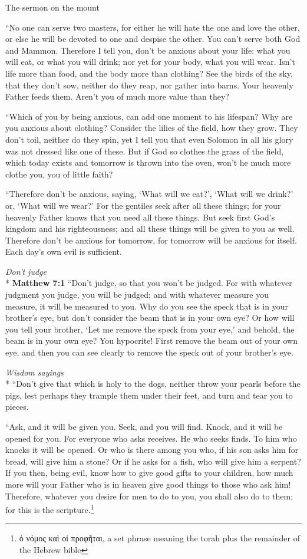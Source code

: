 \documentclass[10pt,twoside]{article} %
\newcommand{\quotesize}{\normalsize{}}
\newenvironment{quotetext}{\begingroup\quotesize}{\endgroup}
\newcommand{\intex}[1]{\index[texts]{#1}}
\newcommand{\bible}[2]{\begin{quotetext}\textbf{#1}\intex{#1} #2\end{quotetext}}
\newcommand{\matthew}[2]{\bible{Matthew #1}{#2}}
\newcommand{\subhead}[1]{\emph{#1}\\*}
\begin{document}
\begin{section}{The sermon on the mount}
{   ``No one can serve two masters, for either he will hate the one and love the other, or else he will be devoted to one and despise the other. You can't serve both God and Mammon.    Therefore I tell you, don't be anxious about your life: what you will eat, or what you will drink; nor yet for your body, what you will wear. Isn't life more than food, and the body more than clothing?    See the birds of the sky, that they don't sow, neither do they reap, nor gather into barns. Your heavenly Father feeds them. Aren't you of much more value than they?

   ``Which of you by being anxious, can add one moment to his lifespan?    Why are you anxious about clothing? Consider the lilies of the field, how they grow. They don't toil, neither do they spin,    yet I tell you that even Solomon in all his glory was not dressed like one of these.    But if God so clothes the grass of the field, which today exists and tomorrow is thrown into the oven, won't he much more clothe you, you of little faith?

   ``Therefore don't be anxious, saying, `What will we eat?', `What will we drink?' or, `What will we wear?'    For the gentiles seek after all these things; for your heavenly Father knows that you need all these things.    But seek first God's kingdom and his righteousness; and all these things will be given to you as well.    Therefore don't be anxious for tomorrow, for tomorrow will be anxious for itself. Each day's own evil is sufficient. 
}

\subhead{Don't judge}
\matthew{7:1}{
    ``Don't judge, so that you won't be judged.    For with whatever judgment you judge, you will be judged; and with whatever measure you measure, it will be measured to you.    Why do you see the speck that is in your brother's eye, but don't consider the beam that is in your own eye?    Or how will you tell your brother, `Let me remove the speck from your eye,' and behold, the beam is in your own eye?    You hypocrite! First remove the beam out of your own eye, and then you can see clearly to remove the speck out of your brother's eye.

\subhead{Wisdom sayings}
   ``Don't give that which is holy to the dogs, neither throw your pearls before the pigs,\label{pearls-before-swine}
 lest perhaps they trample them under their feet, and turn and tear you to pieces.

   ``Ask, and it will be given you. Seek, and you will find. Knock, and it will be opened for you.    For everyone who asks receives. He who seeks finds. To him who knocks it will be opened.    Or who is there among you who, if his son asks him for bread, will give him a stone?    Or if he asks for a fish, who will give him a serpent?    If you then, being evil, know how to give good gifts to your children, how much more will your Father who is in heaven give good things to those who ask him!    Therefore, whatever you desire for men to do to you, you shall also do to them; for this is 
the scripture.\footnote{ὁ νόμος καὶ οἱ προφῆται, a set phrase meaning the torah plus the remainder of the Hebrew bible}

}
\end{section}
\end{document}

